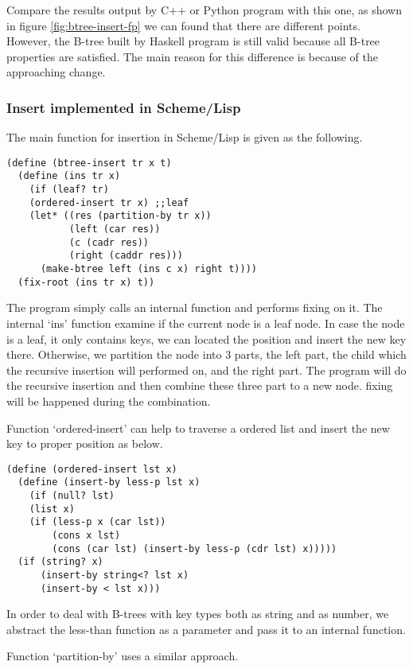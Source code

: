 \documentclass{article}
\begin{document}
Compare the results output by C++ or Python program with this one,
as shown in figure \ref{fig:btree-insert-fp}
we can found that there are different points. However, the B-tree
built by Haskell program is still valid because all B-tree properties
are satisfied. The main reason for this difference is because of
the approaching change.

\subsubsection*{Insert implemented in Scheme/Lisp}
The main function for insertion in Scheme/Lisp is given as the
following.

\lstset{language=lisp}
\begin{lstlisting}
(define (btree-insert tr x t)
  (define (ins tr x)
    (if (leaf? tr)
	(ordered-insert tr x) ;;leaf
	(let* ((res (partition-by tr x))
	       (left (car res))
	       (c (cadr res))
	       (right (caddr res)))
	  (make-btree left (ins c x) right t))))
  (fix-root (ins tr x) t))
\end{lstlisting}

The program simply calls an internal function and performs fixing
on it. The internal `ins' function examine if the current node
is a leaf node. In case the node is a leaf, it only contains keys,
we can located the position and insert the new key there. Otherwise,
we partition the node into 3 parts, the left part, the child which
the recursive insertion will performed on, and the right part.
The program will do the recursive insertion and then combine
these three part to a new node. fixing will be happened during the
combination.

Function `ordered-insert' can help to traverse a ordered list
and insert the new key to proper position as below.

\begin{lstlisting}
(define (ordered-insert lst x)
  (define (insert-by less-p lst x)
    (if (null? lst)
	(list x)
	(if (less-p x (car lst))
	    (cons x lst)
	    (cons (car lst) (insert-by less-p (cdr lst) x)))))
  (if (string? x)
      (insert-by string<? lst x)
      (insert-by < lst x)))
\end{lstlisting}

In order to deal with B-trees with key types both as string and
as number, we abstract the less-than function as a parameter
and pass it to an internal function.

Function `partition-by' uses a similar approach.
\end{document}
